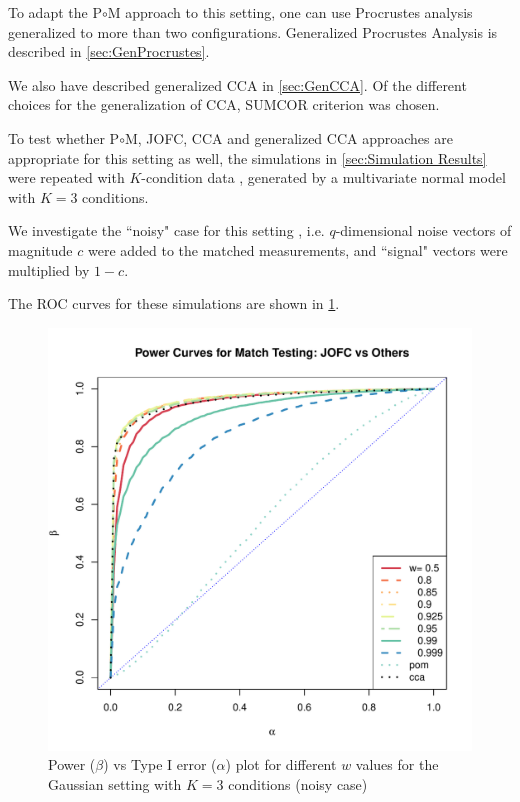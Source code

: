 \documentclass[12pt,oneside,final]{thesis}\usepackage[]{graphicx}\usepackage[]{color}
\begin{document}
To adapt the P$\circ$M approach to this setting, one can use Procrustes analysis  generalized to more than two configurations. Generalized Procrustes Analysis \cite{GPCA} is described in \autoref{sec:GenProcrustes}.

We also have described generalized CCA in \autoref{sec:GenCCA}.  Of the different choices for the generalization of CCA, SUMCOR criterion was chosen.

To test whether P$\circ$M, JOFC, CCA and generalized CCA approaches are appropriate for this setting as well,
the simulations in \autoref{sec:Simulation Results} were repeated with $K$-condition data , generated by a multivariate normal model with $K=3$ conditions. 
 
 We investigate the  ``noisy" case for this setting , i.e. 
 $q$-dimensional noise vectors of magnitude $c$ were added to the matched measurements, and ``signal" vectors were multiplied by $1-c$.  
 
 The ROC curves for these simulations are shown in \ref{fig:MVN-c001-power-w-Kcond}.


\begin{figure}
\includegraphics[scale=0.95]{MVN-FC-Tradeoff-OOS-3cond.pdf}
\caption{Power ($\beta$) vs Type I error ($\alpha$) plot for different $w$ values for the Gaussian setting with $K=3$ conditions (noisy case)}
\label{fig:MVN-c001-power-w-Kcond}
\end{figure}
\end{document}
